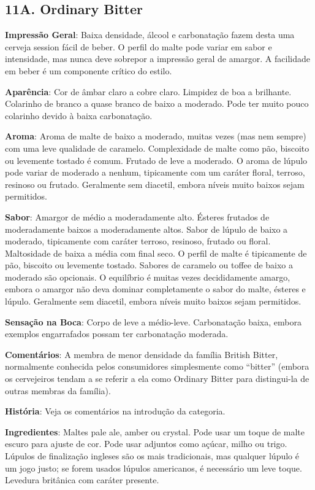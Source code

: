 \subsection*{11A. Ordinary Bitter}

\textbf{Impressão Geral}: Baixa densidade, álcool e carbonatação fazem desta uma cerveja session fácil de beber. O perfil do malte pode variar em sabor e intensidade, mas nunca deve sobrepor a impressão geral de amargor. A facilidade em beber é um componente crítico do estilo.

\textbf{Aparência}: Cor de âmbar claro a cobre claro. Limpidez de boa a brilhante. Colarinho de branco a quase branco de baixo a moderado. Pode ter muito pouco colarinho devido à baixa carbonatação.

\textbf{Aroma}: Aroma de malte de baixo a moderado, muitas vezes (mas nem sempre) com uma leve qualidade de caramelo. Complexidade de malte como pão, biscoito ou levemente tostado é comum. Frutado de leve a moderado. O aroma de lúpulo pode variar de moderado a nenhum, tipicamente com um caráter floral, terroso, resinoso ou frutado. Geralmente sem diacetil, embora níveis muito baixos sejam permitidos.

\textbf{Sabor}: Amargor de médio a moderadamente alto. Ésteres frutados de moderadamente baixos a moderadamente altos. Sabor de lúpulo de baixo a moderado, tipicamente com caráter terroso, resinoso, frutado ou floral. Maltosidade de baixa a média com final seco. O perfil de malte é tipicamente de pão, biscoito ou levemente tostado. Sabores de caramelo ou toffee de baixo a moderado são opcionais. O equilíbrio é muitas vezes decididamente amargo, embora o amargor não deva dominar completamente o sabor do malte, ésteres e lúpulo. Geralmente sem diacetil, embora níveis muito baixos sejam permitidos.

\textbf{Sensação na Boca}: Corpo de leve a médio-leve. Carbonatação baixa, embora exemplos engarrafados possam ter carbonatação moderada.

\textbf{Comentários}: A membra de menor densidade da família British Bitter, normalmente conhecida pelos consumidores simplesmente como “bitter” (embora os cervejeiros tendam a se referir a ela como Ordinary Bitter para distingui-la de outras membras da família).

\textbf{História}: Veja os comentários na introdução da categoria.

\textbf{Ingredientes}: Maltes pale ale, amber ou crystal. Pode usar um toque de malte escuro para ajuste de cor. Pode usar adjuntos como açúcar, milho ou trigo. Lúpulos de finalização ingleses são os mais tradicionais, mas qualquer lúpulo é um jogo justo; se forem usados lúpulos americanos, é necessário um leve toque. Levedura britânica com caráter presente.

